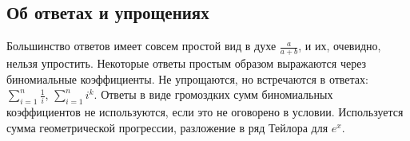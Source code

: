 \subsection{Об ответах и упрощениях}
Большинство ответов имеет совсем простой вид в духе
$\frac{a}{a+b}$, и их, очевидно, нельзя упростить. Некоторые ответы
простым образом выражаются через биномиальные коэффициенты. Не
упрощаются, но встречаются в ответах: $\sum_{i=1}^{n}\frac{1}{i}$,
$\sum_{i=1}^{n} i^{k}$. Ответы в виде громоздких сумм биномиальных
коэффициентов не используются, если это не оговорено в условии.
Используется сумма геометрической прогрессии, разложение в ряд
Тейлора для $e^{x}$.



